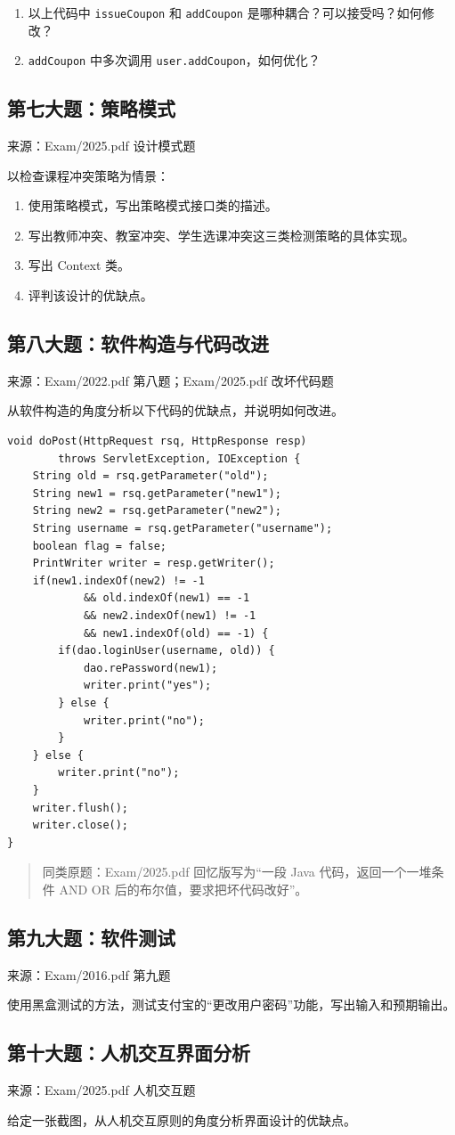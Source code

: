 \documentclass[UTF8,zihao=-4]{ctexart}
\newcommand{\qtitle}[2]{%
  \subsection*{#1}
  {\small\color{TextGray}来源：#2}\par
}
\newenvironment{note}{%
  \begin{quote}\small\color{TextGray}
}{%
  \end{quote}
}
\begin{document}
\begin{enumerate}
  \item[(1)] 以上代码中 \verb|issueCoupon| 和 \verb|addCoupon| 是哪种耦合？可以接受吗？如何修改？
  \item[(2)] \verb|addCoupon| 中多次调用 \verb|user.addCoupon|，如何优化？
\end{enumerate}

\qtitle{第七大题：策略模式}{Exam/2025.pdf 设计模式题}
以检查课程冲突策略为情景：
\begin{enumerate}
  \item 使用策略模式，写出策略模式接口类的描述。
  \item 写出教师冲突、教室冲突、学生选课冲突这三类检测策略的具体实现。
  \item 写出 Context 类。
  \item 评判该设计的优缺点。
\end{enumerate}

\qtitle{第八大题：软件构造与代码改进}{Exam/2022.pdf 第八题；Exam/2025.pdf 改坏代码题}
从软件构造的角度分析以下代码的优缺点，并说明如何改进。

\begin{verbatim}
void doPost(HttpRequest rsq, HttpResponse resp)
        throws ServletException, IOException {
    String old = rsq.getParameter("old");
    String new1 = rsq.getParameter("new1");
    String new2 = rsq.getParameter("new2");
    String username = rsq.getParameter("username");
    boolean flag = false;
    PrintWriter writer = resp.getWriter();
    if(new1.indexOf(new2) != -1
            && old.indexOf(new1) == -1
            && new2.indexOf(new1) != -1
            && new1.indexOf(old) == -1) {
        if(dao.loginUser(username, old)) {
            dao.rePassword(new1);
            writer.print("yes");
        } else {
            writer.print("no");
        }
    } else {
        writer.print("no");
    }
    writer.flush();
    writer.close();
}
\end{verbatim}

\begin{note}
同类原题：Exam/2025.pdf 回忆版写为“一段 Java 代码，返回一个一堆条件 AND OR 后的布尔值，要求把坏代码改好”。
\end{note}

\qtitle{第九大题：软件测试}{Exam/2016.pdf 第九题}
使用黑盒测试的方法，测试支付宝的“更改用户密码”功能，写出输入和预期输出。

\qtitle{第十大题：人机交互界面分析}{Exam/2025.pdf 人机交互题}
给定一张截图，从人机交互原则的角度分析界面设计的优缺点。
\end{document}
